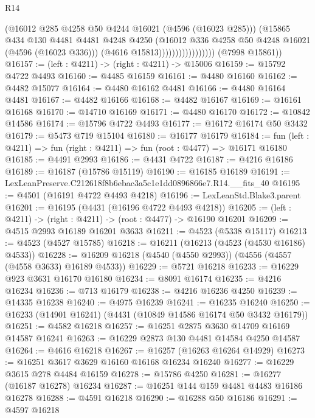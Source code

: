 \begin{lexlean}{R14}
\begin{coremodule}
                                    (@16012 @285 @4258 @50 @4244 @16021 (@4596 (@16023 @285)))
                                    (@15865
                                      @434
                                      @130
                                      @4481
                                      @4481
                                      @4248
                                      @4250
                                      (@16012 @336 @4258 @50 @4248 @16021 (@4596 (@16023 @336)))
                                      (@4616 @15813)))))))))))))))))
      (@7998 @15861))
@16157 := (left : @4211) -> (right : @4211) -> @15006
@16159 := @15792 @4722 @4493
@16160 := @4485 @16159
@16161 := @4480 @16160
@16162 := @4482 @15077
@16164 := @4480 @16162 @4481
@16166 := @4480 @16164 @4481
@16167 := @4482 @16166
@16168 := @4482 @16167
@16169 := @16161 @16168
@16170 := @14710 @16169
@16171 := @4480 @16170
@16172 := @10842 @14586
@16174 := @15796 @4722 @4493
@16177 := @16172 @16174 @50 @3432
@16179 := @5473 @719 @15104
@16180 := @16177 @16179
@16184 := fun (left : @4211) => fun (right : @4211) => fun (root : @4477) => @16171 @16180
@16185 := @4491 @2993
@16186 := @4431 @4722
@16187 := @4216 @16186
@16189 := @16187 (@15786 @15119)
@16190 := @16185 @16189
@16191 := LexLeanPreserve.C212618f8b6ebac3a5c1e1dd0896866e7.R14.__fits_40
@16195 := @4501 (@16191 @4722 @4493 @4218)
@16196 := LexLeanStd.Blake3.parent
@16201 := @16195 (@4431 (@16196 @4722 @4493 @4218))
@16205 := (left : @4211) -> (right : @4211) -> (root : @4477) -> @16190 @16201
@16209 := @4515 @2993 @16189 @16201 @3633
@16211 := @4523 (@5338 @15117)
@16213 := @4523 (@4527 @15785)
@16218 := @16211 (@16213 (@4523 (@4530 @16186) @4533))
@16228 := @16209 @16218 (@4540 (@4550 @2993)) (@4556 (@4557 (@4558 @3633) @16189 @4533))
@16229 := @5721 @16218
@16233 := @16229 @923 @3631 @16170 @16180
@16234 := @8091 @16174
@16235 := @4216 @16234
@16236 := @713 @16179
@16238 := @4216 @16236 @4250
@16239 := @14335 @16238
@16240 := @4975 @16239
@16241 := @16235 @16240
@16250 := @16233 (@14901 @16241) (@4431 (@10849 @14586 @16174 @50 @3432 @16179))
@16251 := @4582 @16218
@16257 := @16251 @2875 @3630 @14709 @16169 @14587 @16241
@16263 := @16229 @2873 @130 @4481 @14584 @4250 @14587
@16264 := @4616 @16218
@16267 := @16257 (@16263 @16264 @14929)
@16273 := @16251 @3617 @3629 @16160 @16168 @16234 @16240
@16277 := @16229 @3615 @278 @4484 @16159
@16278 := @15786 @4250
@16281 := @16277 (@16187 @16278) @16234
@16287 := @16251 @144 @159 @4481 @4483 @16186 @16278
@16288 := @4591 @16218
@16290 := @16288 @50 @16186
@16291 := @4597 @16218

\end{coremodule}
\end{lexlean}
